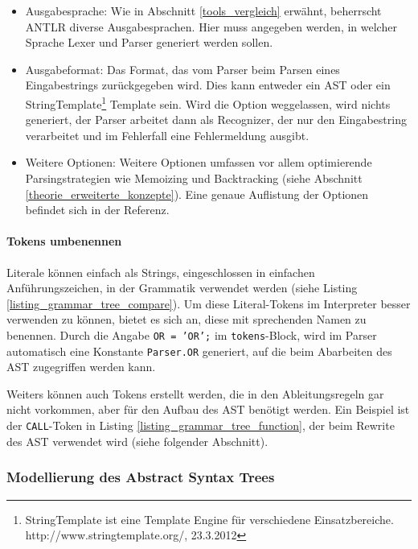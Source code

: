 \begin{itemize}
  \item Ausgabesprache: Wie in Abschnitt \ref{tools_vergleich} erwähnt, beherrscht ANTLR diverse Ausgabesprachen. Hier muss angegeben werden, in welcher Sprache Lexer und Parser generiert werden sollen.

  \item Ausgabeformat: Das Format, das vom Parser beim Parsen eines Eingabestrings zurückgegeben wird. Dies kann entweder ein AST oder ein StringTemplate\footnote{StringTemplate ist eine Template Engine für verschiedene Einsatzbereiche. http://www.stringtemplate.org/, 23.3.2012} Template sein. Wird die Option weggelassen, wird nichts generiert, der Parser arbeitet dann als Recognizer, der nur den Eingabestring verarbeitet und im Fehlerfall eine Fehlermeldung ausgibt.

  \item Weitere Optionen: Weitere Optionen umfassen vor allem optimierende Parsingstrategien wie Memoizing und Backtracking (siehe Abschnitt \ref{theorie_erweiterte_konzepte}). Eine genaue Auflistung der Optionen befindet sich in der Re\-fe\-renz\cite{Parr07}.
\end{itemize}



\paragraph{Tokens umbenennen}

Literale können einfach als Strings, eingeschlossen in einfachen Anführungszeichen, in der Grammatik verwendet werden (siehe Listing \ref{listing_grammar_tree_compare}). Um diese Literal-Tokens im Interpreter besser verwenden zu können, bietet es sich an, diese mit sprechenden Namen zu benennen. Durch die Angabe \texttt{OR = 'OR';} im \texttt{tokens}-Block, wird im Parser automatisch eine Konstante \texttt{Parser.OR} generiert, auf die beim Abarbeiten des AST zugegriffen werden kann.

Weiters können auch Tokens erstellt werden, die in den Ableitungsregeln gar nicht vorkommen, aber für den Aufbau des AST benötigt werden. Ein Beispiel ist der \texttt{CALL}-Token in Listing \ref{listing_grammar_tree_function}, der beim Rewrite des AST verwendet wird (siehe folgender Abschnitt).

\subsubsection{Modellierung des Abstract Syntax Trees}


